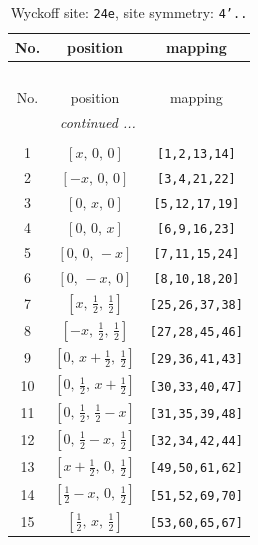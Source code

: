 \documentclass[fleqn,8pt]{jsarticle}
\begin{document}
\begin{longtable}{ccc}
\caption{Wyckoff site: {\tt 24e}, site symmetry: {\tt 4'..}}
 \\
 \hline \hline
No. & position & mapping \\ \hline \endfirsthead

\multicolumn{2}{l}{\tablename\ \thetable{}} \\
 \hline \hline
No. & position & mapping \\ \hline \endhead

 \hline \hline
\multicolumn{2}{r}{\footnotesize\it continued ...} \\ \endfoot

 \hline \hline
\multicolumn{2}{r}{} \\ \endlastfoot

1 & $\left[ x,\, 0,\, 0 \right]$ & {\tt [1,2,13,14]} \\ \hline
2 & $\left[ - x,\, 0,\, 0 \right]$ & {\tt [3,4,21,22]} \\ \hline
3 & $\left[ 0,\, x,\, 0 \right]$ & {\tt [5,12,17,19]} \\ \hline
4 & $\left[ 0,\, 0,\, x \right]$ & {\tt [6,9,16,23]} \\ \hline
5 & $\left[ 0,\, 0,\, - x \right]$ & {\tt [7,11,15,24]} \\ \hline
6 & $\left[ 0,\, - x,\, 0 \right]$ & {\tt [8,10,18,20]} \\ \hline
7 & $\left[ x,\, \frac{1}{2},\, \frac{1}{2} \right]$ & {\tt [25,26,37,38]} \\ \hline
8 & $\left[ - x,\, \frac{1}{2},\, \frac{1}{2} \right]$ & {\tt [27,28,45,46]} \\ \hline
9 & $\left[ 0,\, x + \frac{1}{2},\, \frac{1}{2} \right]$ & {\tt [29,36,41,43]} \\ \hline
10 & $\left[ 0,\, \frac{1}{2},\, x + \frac{1}{2} \right]$ & {\tt [30,33,40,47]} \\ \hline
11 & $\left[ 0,\, \frac{1}{2},\, \frac{1}{2} - x \right]$ & {\tt [31,35,39,48]} \\ \hline
12 & $\left[ 0,\, \frac{1}{2} - x,\, \frac{1}{2} \right]$ & {\tt [32,34,42,44]} \\ \hline
13 & $\left[ x + \frac{1}{2},\, 0,\, \frac{1}{2} \right]$ & {\tt [49,50,61,62]} \\ \hline
14 & $\left[ \frac{1}{2} - x,\, 0,\, \frac{1}{2} \right]$ & {\tt [51,52,69,70]} \\ \hline
15 & $\left[ \frac{1}{2},\, x,\, \frac{1}{2} \right]$ & {\tt [53,60,65,67]} \\ \hline

\end{longtable}
\end{document}
